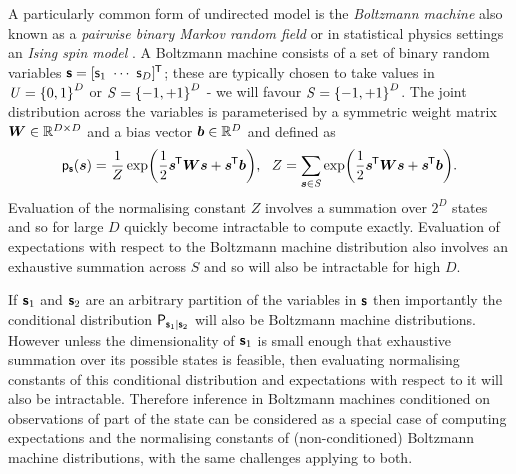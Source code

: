 A particularly common form of undirected model is the \emph{Boltzmann machine} \citep{ackley1985learning} also known as a \emph{pairwise binary Markov random field} \citep{kindermann1980markov} or in statistical physics settings an \emph{Ising spin model} \citep{ising1925beitrag}. A Boltzmann machine consists of a set of binary random variables $\boldsymbol{\mathsf{s}} = [\mathsf{s}_1 ~ \cdots ~ \mathsf{s}_D]^{\mkern-1.5mu\mathsf{T}}$; these are typically chosen to take values in $\set{U} = \fset{0,1}^D$ or $\set{S} = \fset{-1,+1}^D$ - we will favour $\set{S} = \fset{-1,+1}^D$. The joint distribution across the variables is parameterised by a symmetric weight matrix $\boldsymbol{W} \in \mathbb{R}^{D\times D}$ and a bias vector $\boldsymbol{b} \in \mathbb{R}^D$ and defined as
\begin{equation}\label{eq:boltzmann-machine-distribution}
  \pden{\rvct{s}}(\vct{s}) =
  \frac{1}{Z} \exp\lpa \frac{1}{2}\vct{s}\tr\mtx{W}\vct{s} + \vct{s}\tr\vct{b}\rpa,
  ~~
  Z = \sum_{\vct{s} \in \set{S}} \exp\lpa \frac{1}{2}\vct{s}\tr\mtx{W}\vct{s} + \vct{s}\tr\vct{b}\rpa.
\end{equation}
Evaluation of the normalising constant $Z$ involves a summation over $2^D$ states and so for large $D$ quickly become intractable to compute exactly. Evaluation of expectations with respect to the Boltzmann machine distribution also involves an exhaustive summation across $S$ and so will also be intractable for high $D$. %

If $\boldsymbol{\mathsf{s}}_1$ and $\boldsymbol{\mathsf{s}}_2$ are an arbitrary partition of the variables in $\boldsymbol{\mathsf{s}}$ then importantly the conditional distribution $\mathsf{P}_{\boldsymbol{\mathsf{s}}_1|\boldsymbol{\mathsf{s}}_2}$ will also be Boltzmann machine distributions. However unless the dimensionality of $\boldsymbol{\mathsf{s}}_1$ is small enough that exhaustive summation over its possible states is feasible, then evaluating normalising constants of this conditional distribution and expectations with respect to it will also be intractable. Therefore inference in Boltzmann machines conditioned on observations of part of the state can be considered as a special case of computing expectations and the normalising constants of (non-conditioned) Boltzmann machine distributions, with the same challenges applying to both.

